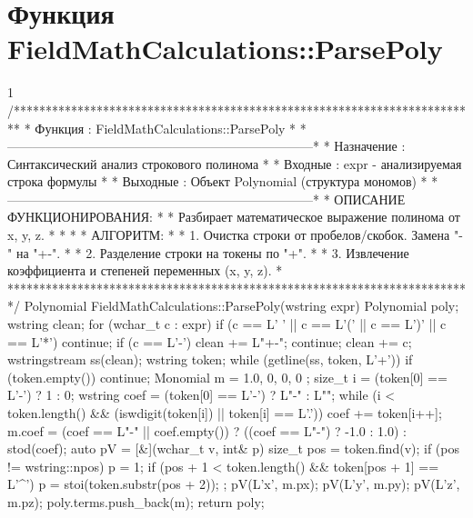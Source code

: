\section{Функция FieldMathCalculations::ParsePoly}
\footnotesize
\begin{listing}{1}
/*************************************************************************
* Функция       : FieldMathCalculations::ParsePoly                       *
*------------------------------------------------------------------------*
* Назначение    : Синтаксический анализ строкового полинома              *
* Входные       : expr - анализируемая строка формулы                    *
* Выходные      : Объект Polynomial (структура мономов)                  *
*------------------------------------------------------------------------*
* ОПИСАНИЕ ФУНКЦИОНИРОВАНИЯ:                                             *
* Разбирает математическое выражение полинома от x, y, z.                *
* *
* АЛГОРИТМ:                                                              *
* 1. Очистка строки от пробелов/скобок. Замена "-" на "+-".              *
* 2. Разделение строки на токены по "+".                                 *
* 3. Извлечение коэффициента и степеней переменных (x, y, z).            *
*************************************************************************/
Polynomial FieldMathCalculations::ParsePoly(wstring expr) {
    Polynomial poly; wstring clean;
    for (wchar_t c : expr) {
        if (c == L' ' || c == L'(' || c == L')' || c == L'*') continue;
        if (c == L'-') { clean += L"+-"; continue; } clean += c; }
    wstringstream ss(clean); wstring token;
    while (getline(ss, token, L'+')) {
        if (token.empty()) continue;
        Monomial m = { 1.0, 0, 0, 0 }; 
        size_t i = (token[0] == L'-') ? 1 : 0;
        wstring coef = (token[0] == L'-') ? L"-" : L"";
        while (i < token.length() && (iswdigit(token[i]) || 
               token[i] == L'.')) coef += token[i++]; 
        m.coef = (coef == L"-" || coef.empty()) ? 
                 ((coef == L"-") ? -1.0 : 1.0) : stod(coef);    
        auto pV = [&](wchar_t v, int& p) { size_t pos = token.find(v); 
            if (pos != wstring::npos) { p = 1; 
                if (pos + 1 < token.length() && token[pos + 1] == L'^') 
                    p = stoi(token.substr(pos + 2)); } 
        };
        pV(L'x', m.px); pV(L'y', m.py); pV(L'z', m.pz);
        poly.terms.push_back(m);}
    return poly;
}
\end{listing}
\normalsize

\pagebreak

